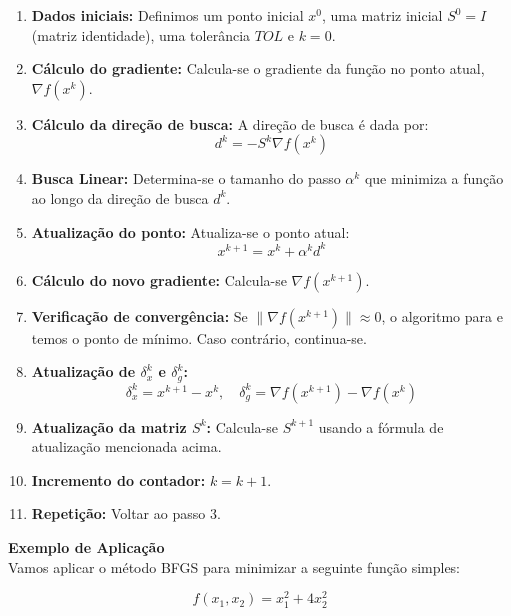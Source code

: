 \documentclass[a4paper, 12pt]{article}
\begin{document}
\begin{enumerate}
    \item \textbf{Dados iniciais:} Definimos um ponto inicial $x^0$, uma matriz inicial $S^0 = I$ (matriz identidade), uma tolerância $TOL$ e $k = 0$.
    \item \textbf{Cálculo do gradiente:} Calcula-se o gradiente da função no ponto atual, $\nabla f(x^k)$.
    \item \textbf{Cálculo da direção de busca:} A direção de busca é dada por:
    \begin{equation}
    d^k = - S^k \nabla f(x^k)
    \end{equation}
    \item \textbf{Busca Linear:} Determina-se o tamanho do passo $\alpha^k$ que minimiza a função ao longo da direção de busca $d^k$.
    \item \textbf{Atualização do ponto:} Atualiza-se o ponto atual:
    \begin{equation}
    x^{k+1} = x^k + \alpha^k d^k
    \end{equation}
    \item \textbf{Cálculo do novo gradiente:} Calcula-se $\nabla f(x^{k+1})$.
    \item \textbf{Verificação de convergência:} Se $\|\nabla f(x^{k+1})\| \approx 0$, o algoritmo para e temos o ponto de mínimo. Caso contrário, continua-se.
    \item \textbf{Atualização de $\delta_x^k$ e $\delta_g^k$:}
    \begin{equation}
    \delta_x^k = x^{k+1} - x^k, \quad \delta_g^k = \nabla f(x^{k+1}) - \nabla f(x^k)
    \end{equation}
    \item \textbf{Atualização da matriz $S^k$:} Calcula-se $S^{k+1}$ usando a fórmula de atualização mencionada acima.
    \item \textbf{Incremento do contador:} $k = k + 1$.
    \item \textbf{Repetição:} Voltar ao passo 3.\\
\end{enumerate}

\textbf{Exemplo de Aplicação}\\

Vamos aplicar o método BFGS para minimizar a seguinte função simples:

\begin{equation}
f(x_1, x_2) = x_1^2 + 4x_2^2
\end{equation}
\end{document}
